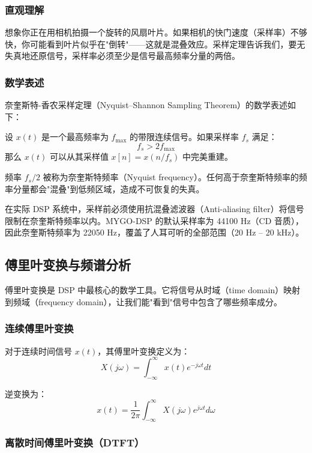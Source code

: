 ﻿\documentclass[12pt,a4paper,oneside]{ctexbook}
\begin{document}
\subsubsection{直观理解}

想象你正在用相机拍摄一个旋转的风扇叶片。如果相机的快门速度（采样率）不够快，你可能看到叶片似乎在"倒转"——这就是混叠效应。采样定理告诉我们，要无失真地还原信号，采样率必须至少是信号最高频率分量的两倍。

\subsubsection{数学表述}

奈奎斯特-香农采样定理（Nyquist--Shannon Sampling Theorem）的数学表述如下：

设 \(x(t)\) 是一个最高频率为 \(f_{\text{max}}\) 的带限连续信号。如果采样率 \(f_s\) 满足：
\[
f_s > 2 f_{\text{max}}
\]
那么 \(x(t)\) 可以从其采样值 \(x[n] = x(n / f_s)\) 中完美重建。

频率 \(f_s / 2\) 被称为奈奎斯特频率（Nyquist frequency）。任何高于奈奎斯特频率的频率分量都会"混叠"到低频区域，造成不可恢复的失真。

在实际 DSP 系统中，采样前必须使用抗混叠滤波器（Anti-aliasing filter）将信号限制在奈奎斯特频率以内。MYGO-DSP 的默认采样率为 44100 Hz（CD 音质），因此奈奎斯特频率为 22050 Hz，覆盖了人耳可听的全部范围（20 Hz -- 20 kHz）。

\subsection{傅里叶变换与频谱分析}

傅里叶变换是 DSP 中最核心的数学工具。它将信号从时域（time domain）映射到频域（frequency domain），让我们能"看到"信号中包含了哪些频率成分。

\subsubsection{连续傅里叶变换}

对于连续时间信号 \(x(t)\)，其傅里叶变换定义为：
\[
X(j\omega) = \int_{-\infty}^{\infty} x(t) e^{-j\omega t} dt
\]

逆变换为：
\[
x(t) = \frac{1}{2\pi} \int_{-\infty}^{\infty} X(j\omega) e^{j\omega t} d\omega
\]

\subsubsection{离散时间傅里叶变换（DTFT）}
\end{document}
